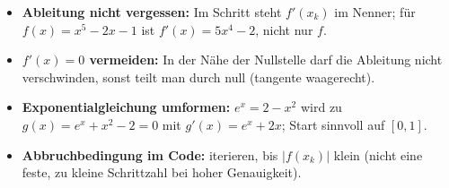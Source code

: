 \begin{achtung}
\begin{itemize}
  \item \textbf{Ableitung nicht vergessen:} Im Schritt steht $f'(x_k)$ im
        Nenner; für $f(x)=x^5-2x-1$ ist $f'(x)=5x^4-2$, nicht nur $f$.
  \item \textbf{$f'(x)=0$ vermeiden:} In der Nähe der Nullstelle darf die
        Ableitung nicht verschwinden, sonst teilt man durch null (tangente
        waagerecht).
  \item \textbf{Exponentialgleichung umformen:} $e^x=2-x^2$ wird zu
        $g(x)=e^x+x^2-2=0$ mit $g'(x)=e^x+2x$; Start sinnvoll auf $[0,1]$.
  \item \textbf{Abbruchbedingung im Code:} iterieren, bis $|f(x_k)|$ klein
        (nicht eine feste, zu kleine Schrittzahl bei hoher Genauigkeit).
\end{itemize}
\end{achtung}
